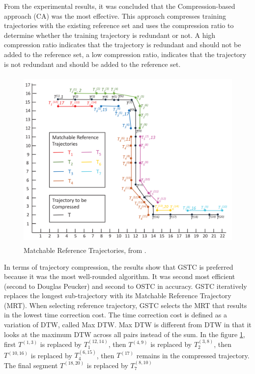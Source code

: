 From the experimental results, it was concluded that the Compression-based approach (CA) was the most effective. This approach compresses training trajectories with the existing reference set and uses the compression ratio to determine whether the training trajectory is redundant or not. A high compression ratio indicates that the trajectory is redundant and should not be added to the reference set, a low compression ratio, indicates that the trajectory is not redundant and should be added to the reference set.
\begin{figure}[h]
    \begin{center}
        \includegraphics[height=9cm, keepaspectratio]{./figures/rest.png}
        \caption{Matchable Reference Trajectories, from \textcite{zhao2018rest}.}
        \label{fig:rest}
    \end{center}
\end{figure}

In terms of trajectory compression, the results show that GSTC is preferred because it was the most well-rounded algorithm. It was second most efficient (second to Douglas Peucker) and second to OSTC in accuracy. GSTC iteratively replaces the longest sub-trajectory with its Matchable Reference Trajectory (MRT). When selecting reference trajectory, GSTC selects the MRT that results in the lowest time correction cost. The time correction cost is defined as a variation of DTW, called Max DTW. Max DTW is different from DTW in that it looks at the maximum DTW across all pairs instead of the sum. In the figure \ref{fig:rest}, first $T^{(1,3)}$ is replaced by $T_1^{(12,14)}$, then $T^{(4,9)}$ is replaced by $T_2^{(3,8)}$, then $T^{(10,16)}$ is replaced by $T_4^{(6,15)}$, then $T^{(17)}$ remains in the compressed trajectory. The final segment $T^{(18,20)}$ is replaced by $T_7^{(8,10)}$

